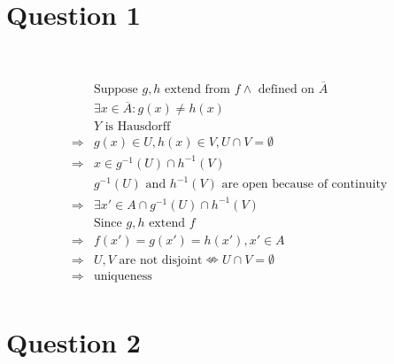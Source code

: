 \documentclass{article}
\begin{document}
\section*{Question 1}

~

\begin{equation*}
    \begin{split}
        &\text{Suppose }g,h\text{ extend from }f\land \text{ defined on }\overline{A}\\
        &\exists x\in \overline{A}:g(x)\ne h(x)\\
        &Y\text{ is Hausdorff}\\
        \Rightarrow&g(x)\in U,h(x)\in V,U\cap V=\emptyset\\
        \Rightarrow&x\in g^{-1}(U)\cap h^{-1}(V)\\
        &g^{-1}(U)\text{ and }h^{-1}(V)\text{ are open because of continuity}\\
        \Rightarrow&\exists x'\in A\cap g^{-1}(U)\cap h^{-1}(V)\\
        &\text{Since }g,h\text{ extend }f\\
        \Rightarrow&f(x')=g(x')=h(x'),x'\in A\\
        \Rightarrow&U,V\text{ are not disjoint}\nLeftrightarrow U\cap V=\emptyset\\
        \Rightarrow&\text{uniqueness}\\
    \end{split}
\end{equation*}

\newpage

\section*{Question 2}

~
\end{document}
